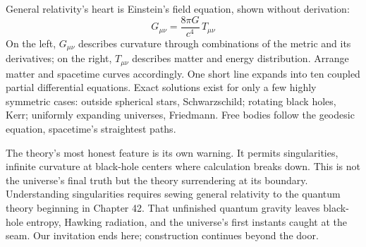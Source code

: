 \begin{challenge}
General relativity's heart is Einstein's field equation, shown without derivation:
\[
G_{\mu\nu}=\frac{8\pi G}{c^{4}}\,T_{\mu\nu}
\]
On the left, \(G_{\mu\nu}\) describes curvature through combinations of the metric and its derivatives; on the right, \(T_{\mu\nu}\) describes matter and energy distribution. Arrange matter and spacetime curves accordingly. One short line expands into ten coupled partial differential equations. Exact solutions exist for only a few highly symmetric cases: outside spherical stars, Schwarzschild; rotating black holes, Kerr; uniformly expanding universes, Friedmann. Free bodies follow the geodesic equation, spacetime's straightest paths.

The theory's most honest feature is its own warning. It permits singularities, infinite curvature at black-hole centers where calculation breaks down. This is not the universe's final truth but the theory surrendering at its boundary. Understanding singularities requires sewing general relativity to the quantum theory beginning in Chapter 42. That unfinished quantum gravity leaves black-hole entropy, Hawking radiation, and the universe's first instants caught at the seam. Our invitation ends here; construction continues beyond the door.
\end{challenge}


